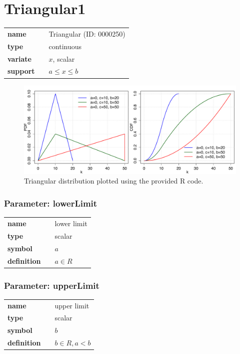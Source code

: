 \section*{Triangular1} 

  \bigskip 

\begin{tabular}{p{2cm}cl}
\textbf{name} & & Triangular (ID: 0000250)\\ 
 
\textbf{type} & & continuous \\ 

\textbf{variate} & & $x$, scalar \\ 

\textbf{support} & & $a \leq x \leq b$
\end{tabular}

\begin{figure}[ht!]
\centering
  \includegraphics[width=140mm]{pics/Triangular.pdf}
 \caption{Triangular distribution plotted using the provided R code.}
 \label{fig:Triangular}
\end{figure}

\subsubsection*{Parameter: lowerLimit}

\noindent\begin{tabular}{p{2cm}cl}
\textbf{name} & & lower limit \\
\textbf{type} & & scalar \\
\textbf{symbol} & & $a$  \\
\textbf{definition} & & $a \in R$
\end{tabular}
\subsubsection*{Parameter: upperLimit}

\noindent\begin{tabular}{p{2cm}cl}
\textbf{name} & & upper limit \\
\textbf{type} & & scalar \\
\textbf{symbol} & & $b$  \\
\textbf{definition} & & $b \in R, a < b$
\end{tabular}
